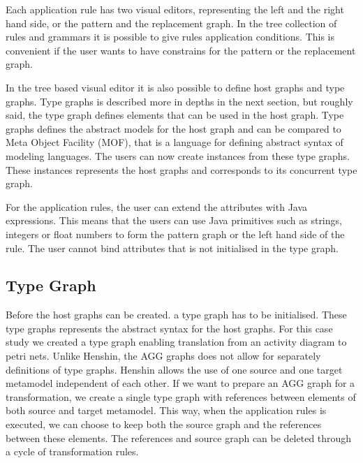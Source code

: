\documentclass[pdftex,11pt,a4paper]{article}
\begin{document}
\indent Each application rule has two visual editors, representing the left and
the right hand side, or the pattern and the replacement graph. In the tree
collection of rules and grammars it is possible to give rules application
conditions. This is convenient if the user wants to have constrains for the
pattern or the replacement graph. 

\indent In the tree based visual editor it is also possible to define host
graphs and type graphs. Type graphs is described more in depths in the next
section, but roughly said, the type graph defines elements that can be used in
the host graph. Type graphs defines the abstract models for the host graph and
can be compared to Meta Object Facility (MOF)\cite{MOF}, that is a language for
defining abstract syntax of modeling languages. The users can now create instances
from these type graphs. These instances represents the host graphs and
corresponds to its concurrent type graph. 

\indent For the application rules, the user can extend the attributes with Java
expressions. This means that the users can use Java primitives such as strings,
integers or float numbers to form the pattern graph or the left hand side of the
rule. The user cannot bind attributes that is not initialised in the type graph. 

\subsection{Type Graph}

\noindent Before the host graphs can be created. a type graph has to be
initialised. These type graphs represents the abstract syntax for the host
graphs. For this case study we created a type graph enabling translation from
an activity diagram to petri nets. Unlike Henshin, the AGG graphs does not
allow for separately definitions of type graphs. Henshin allows the use of one
source and one target metamodel independent of each other. If we want to
prepare an AGG graph for a transformation, we create a single type graph with
references between elements of both source and target metamodel. This way, when
the application rules is executed, we can choose to keep both the source graph
and the references between these elements. The references and source graph can
be deleted through a cycle of transformation rules.
\end{document}
